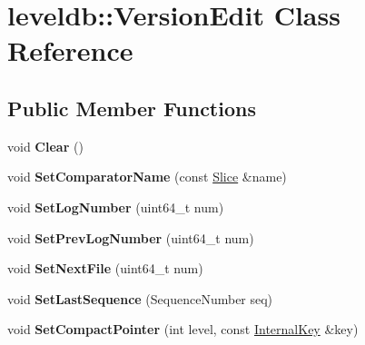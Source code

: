 \hypertarget{classleveldb_1_1_version_edit}{}\section{leveldb\+:\+:Version\+Edit Class Reference}
\label{classleveldb_1_1_version_edit}
\subsection*{Public Member Functions}
\begin{DoxyCompactItemize}
\item 
\mbox{\label{classleveldb_1_1_version_edit_a259c9de14d58e231178904c1559e4b5e}} 
void {\bfseries Clear} ()
\item 
\mbox{\label{classleveldb_1_1_version_edit_ab562147cdd82b184e86e88bd375a718c}} 
void {\bfseries Set\+Comparator\+Name} (const \mbox{\hyperlink{classleveldb_1_1_slice}{Slice}} \&name)
\item 
\mbox{\label{classleveldb_1_1_version_edit_a47e5c58d34b0e27dc8990687e0c5477a}} 
void {\bfseries Set\+Log\+Number} (uint64\+\_\+t num)
\item 
\mbox{\label{classleveldb_1_1_version_edit_ac1b5689f62e7a8f63c4eefa437a4f2f3}} 
void {\bfseries Set\+Prev\+Log\+Number} (uint64\+\_\+t num)
\item 
\mbox{\label{classleveldb_1_1_version_edit_a4c104515adf573be0ead29e6835f14fb}} 
void {\bfseries Set\+Next\+File} (uint64\+\_\+t num)
\item 
\mbox{\label{classleveldb_1_1_version_edit_abd6e841ed400672d33d26f4b187a66bf}} 
void {\bfseries Set\+Last\+Sequence} (Sequence\+Number seq)
\item 
\mbox{\label{classleveldb_1_1_version_edit_ac9b26dfba1188705d7fc4deaf047271c}} 
void {\bfseries Set\+Compact\+Pointer} (int level, const \mbox{\hyperlink{classleveldb_1_1_internal_key}{Internal\+Key}} \&key)
\item 
\mbox{\label{classleveldb_1_1_version_edit_a4cd5cc92761b7ae5b5f9cff46cb88263}} 

\end{DoxyCompactItemize}
